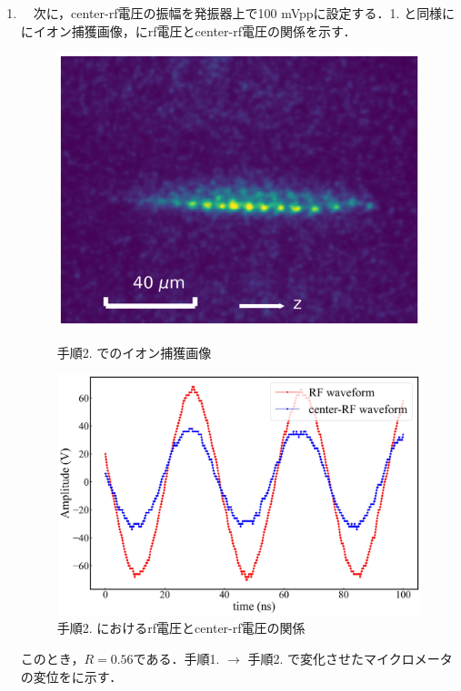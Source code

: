 \begin{enumerate}
\item　次に，center-rf電圧の振幅を発振器上で100 mVppに設定する．1. と同様ににイオン捕獲画像，にrf電圧とcenter-rf電圧の関係を示す．\\
%
\clearpage
%
\begin{figure}[h]
	\begin{minipage}{0.48\linewidth}
	\begin{center}
		\includegraphics[width = 0.6\columnwidth]{./methods/figure/2_2D.jpg}
		\caption{手順2. でのイオン捕獲画像}
		\label{fig:2_2D}
	\end{center}
	\end{minipage}
	\begin{minipage}{0.48\linewidth}
		\begin{center}
			\includegraphics[width = 0.9\columnwidth]{./methods/figure/2_2D_wave.jpg}
			\caption{手順2. におけるrf電圧とcenter-rf電圧の関係}
			\label{fig:2_2D_wave}
		\end{center}
	\end{minipage}
\end{figure}

このとき，$R=0.56$である．手順1. $\rightarrow$ 手順2. で変化させたマイクロメータの変位をに示す．


\end{enumerate}
